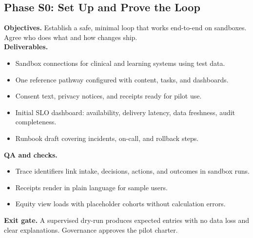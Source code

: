\documentclass[12pt]{article}
\begin{document}
\subsection*{Phase S0: Set Up and Prove the Loop}
\textbf{Objectives.} Establish a safe, minimal loop that works end-to-end on sandboxes. Agree who does what and how changes ship.\\
\textbf{Deliverables.}
\begin{itemize}[leftmargin=*]
  \item Sandbox connections for clinical and learning systems using test data.
  \item One reference pathway configured with content, tasks, and dashboards.
  \item Consent text, privacy notices, and receipts ready for pilot use.
  \item Initial SLO dashboard: availability, delivery latency, data freshness, audit completeness.
  \item Runbook draft covering incidents, on-call, and rollback steps.
\end{itemize}
\textbf{QA and checks.}
\begin{itemize}[leftmargin=*]
  \item Trace identifiers link intake, decisions, actions, and outcomes in sandbox runs.
  \item Receipts render in plain language for sample users.
  \item Equity view loads with placeholder cohorts without calculation errors.
\end{itemize}
\textbf{Exit gate.} A supervised dry-run produces expected entries with no data loss and clear explanations. Governance approves the pilot charter.
\end{document}
